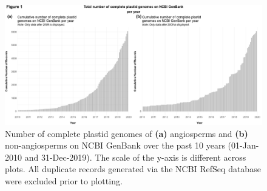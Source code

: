 \documentclass[a4paper,portrait]{article}
\begin{document}
\begin{figure}[!htbp]%
\centering
\includegraphics[width=1.00\linewidth]{input/MANUSCRIPT_Figure1.pdf}
\caption{Number of complete plastid genomes of \textbf{(a)} angiosperms and \textbf{(b)} non-angiosperms on NCBI GenBank over the past 10 years (01-Jan-2010 and 31-Dec-2019). The scale of the y-axis is different across plots. All duplicate records generated via the NCBI RefSeq database were excluded prior to plotting.}
\label{fig:Figure1}
\end{figure}
\end{document}
